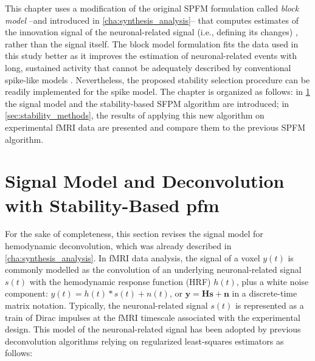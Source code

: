 This chapter uses a modification of the original SPFM formulation called
\textit{block model} --and introduced in \cref{cha:synthesis_analysis}-- that
computes estimates of the innovation signal of the neuronal-related signal
(i.e., defining its changes)
\citep{Karahanoglu2013TotalactivationfMRI,Cherkaoui2019Sparsitybasedblind,Urunuela2023HemodynamicDeconvolutionDemystified},
rather than the signal itself. The block model formulation fits the data used in
this study better as it improves the estimation of neuronal-related events with
long, sustained activity
\citep{Karahanoglu2013TotalactivationfMRI,Cherkaoui2019Sparsitybasedblind,Urunuela2023HemodynamicDeconvolutionDemystified}
that cannot be adequately described by conventional spike-like models
\citep{Khalidov2011ActiveletsWaveletssparse,Gaudes2010Detectioncharacterizationsingle,Gaudes2013Paradigmfreemapping}.
Nevertheless, the proposed stability selection procedure can be readily
implemented for the spike model. The chapter is organized as follows: in
\cref{sec:stability_model} the signal model and the stability-based SFPM
algorithm are introduced; in \cref{sec:stability_methods}, the results of
applying this new algorithm on experimental fMRI data are presented and compare
them to the previous SPFM algorithm.

\section{Signal Model and Deconvolution with Stability-Based \acrlong*{pfm}}
\label{sec:stability_model}
For the sake of completeness, this section revises the signal model for hemodynamic deconvolution, which was already described in \cref{cha:synthesis_analysis}. 
In fMRI data analysis, the signal of a voxel $y(t)$ is commonly modelled as the
convolution of an underlying neuronal-related signal $s(t)$ with the hemodynamic
response function (HRF) $h(t)$, plus a white noise component: $y(t)=
h(t)*s(t)+n(t)$, or $\mathbf{y}=\mathbf{Hs}+\mathbf{n}$ in a discrete-time matrix
notation. Typically, the neuronal-related signal $s(t)$ is represented as a
train of Dirac impulses at the fMRI timescale associated with the experimental
design. This model of the neuronal-related signal has been adopted by previous
deconvolution algorithms
\citep{HernandezGarcia2011Neuronaleventdetection,Gaudes2010Detectioncharacterizationsingle,Gaudes2013Paradigmfreemapping}
relying on regularized least-squares estimators as follows:

